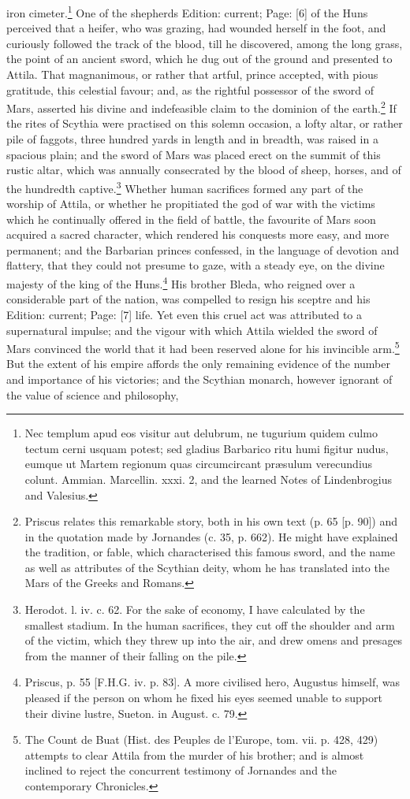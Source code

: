 iron cimeter.\footnote{Nec templum apud eos visitur aut delubrum, ne tugurium quidem culmo tectum cerni usquam potest; sed gladius Barbarico ritu humi figitur nudus, eumque ut Martem regionum quas circumcircant præsulum verecundius colunt. Ammian. Marcellin. xxxi. 2, and the learned Notes of Lindenbrogius and Valesius.} One of the shepherds Edition: current; Page: [6] of the Huns perceived that a heifer, who was grazing, had wounded herself in the foot, and curiously followed the track of the blood, till he discovered, among the long grass, the point of an ancient sword, which he dug out of the ground and presented to Attila. That magnanimous, or rather that artful, prince accepted, with pious gratitude, this celestial favour; and, as the rightful possessor of the sword of Mars, asserted his divine and indefeasible claim to the dominion of the earth.\footnote{Priscus relates this remarkable story, both in his own text (p. 65 [p. 90]) and in the quotation made by Jornandes (c. 35, p. 662). He might have explained the tradition, or fable, which characterised this famous sword, and the name as well as attributes of the Scythian deity, whom he has translated into the Mars of the Greeks and Romans.} If the rites of Scythia were practised on this solemn occasion, a lofty altar, or rather pile of faggots, three hundred yards in length and in breadth, was raised in a spacious plain; and the sword of Mars was placed erect on the summit of this rustic altar, which was annually consecrated by the blood of sheep, horses, and of the hundredth captive.\footnote{Herodot. l. iv. c. 62. For the sake of economy, I have calculated by the smallest stadium. In the human sacrifices, they cut off the shoulder and arm of the victim, which they threw up into the air, and drew omens and presages from the manner of their falling on the pile.} Whether human sacrifices formed any part of the worship of Attila, or whether he propitiated the god of war with the victims which he continually offered in the field of battle, the favourite of Mars soon acquired a sacred character, which rendered his conquests more easy, and more permanent; and the Barbarian princes confessed, in the language of devotion and flattery, that they could not presume to gaze, with a steady eye, on the divine majesty of the king of the Huns.\footnote{Priscus, p. 55 [F.H.G. iv. p. 83]. A more civilised hero, Augustus himself, was pleased if the person on whom he fixed his eyes seemed unable to support their divine lustre, Sueton. in August. c. 79.} His brother Bleda, who reigned over a considerable part of the nation, was compelled to resign his sceptre and his Edition: current; Page: [7] life. Yet even this cruel act was attributed to a supernatural impulse; and the vigour with which Attila wielded the sword of Mars convinced the world that it had been reserved alone for his invincible arm.\footnote{The Count de Buat (Hist. des Peuples de l\texthebrew{}’Europe, tom. vii. p. 428, 429) attempts to clear Attila from the murder of his brother; and is almost inclined to reject the concurrent testimony of Jornandes and the contemporary Chronicles.} But the extent of his empire affords the only remaining evidence of the number and importance of his victories; and the Scythian monarch, however ignorant of the value of science and philosophy, 
